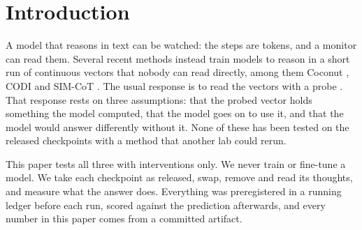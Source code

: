 \documentclass{article}
\begin{document}
\section{Introduction}

A model that reasons in text can be watched: the steps are tokens, and a monitor can read them. Several recent methods instead train models to reason in a short run of continuous vectors that nobody can read directly, among them Coconut \citep{hao2024coconut}, CODI \citep{shen2025codi} and SIM-CoT \citep{wei2026simcot}. The usual response is to read the vectors with a probe \citep{ramjee2026ulterior}. That response rests on three assumptions: that the probed vector holds something the model computed, that the model goes on to use it, and that the model would answer differently without it. None of these has been tested on the released checkpoints with a method that another lab could rerun.

This paper tests all three with interventions only. We never train or fine-tune a model. We take each checkpoint as released, swap, remove and read its thoughts, and measure what the answer does. Everything was preregistered in a running ledger before each run, scored against the prediction afterwards, and every number in this paper comes from a committed artifact.
\end{document}
